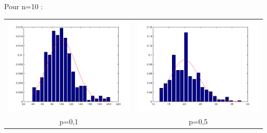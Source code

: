 \documentclass{article}
\begin{document}
\newpage
Pour n=10 : \\
\begin{tabular}{c c}
	\includegraphics[scale=0.5]{graph/n10p1.png} & 
	\includegraphics[scale=0.5]{graph/n10p5.png} \\
	p=0,1 &	p=0,5
\end{tabular}\\
\end{document}
